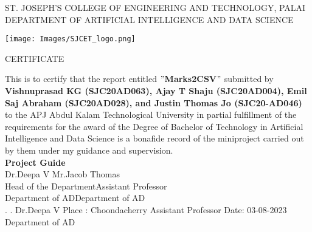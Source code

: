 \thispagestyle{empty}
\begin{center}
\normalsize{ST. JOSEPH’S COLLEGE OF ENGINEERING AND TECHNOLOGY, PALAI}\\[0.5cm]
\normalsize
 { DEPARTMENT OF ARTIFICIAL INTELLIGENCE AND DATA SCIENCE}\\[1.0cm]%
   \begin{center}
   \texttt{[image: Images/SJCET\_logo.png]}
   \end{center}
{\large CERTIFICATE}\\[1.5cm]
\end{center}
\normalsize 
This is to certify that the report entitled {\bf $"$Marks2CSV$"$} submitted by { \bf Vishnuprasad KG (SJC20AD063), Ajay T Shaju (SJC20AD004), Emil Saj Abraham (SJC20AD028), and Justin Thomas Jo (SJC20-AD046)} to the APJ Abdul Kalam Technological University in partial fulfillment of the requirements for the award of the Degree of Bachelor of Technology in Artificial Intelligence and Data Science is a bonafide record of the miniproject carried out by them under my guidance and supervision.\vspace{1.3 cm}\\
{\bf Project Guide}\hspace{8.35 cm}{\bf Project Coordinator}\\
Dr.Deepa V\hspace{9.0 cm} Mr.Jacob Thomas\\
Head of the Department\hspace{6.85 cm}Assistant Professor\hspace{2.6 cm}\\Department of AD\hspace{7.9 cm}Department of AD
\vspace{1.3 cm}\\
.\hspace{11.06 cm}{\bf Head of the Department}
\newline
.\hspace{11.01 cm} Dr.Deepa V
\newline
Place : Choondacherry  \hspace{6.87 cm} Assistant Professor
\newline
Date\hspace{0.25 cm}: 03-08-2023 \hspace{7.7 cm} Department of AD      

\newpage

